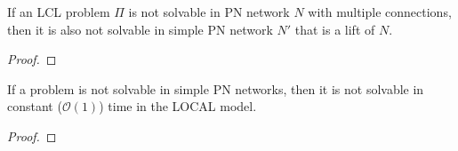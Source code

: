 
%
\begin{theorem} \label{thm:lcl_nonsolvability:4}
    If an LCL problem $\Pi$ is not solvable in PN network $N$ with multiple connections, then it is also not solvable in simple PN network $N'$ that is a lift of $N$.
\end{theorem}
\begin{proof}
\end{proof}



\begin{theorem}
    If a problem is not solvable in simple PN networks, then it is not solvable in constant ($\mathcal{O}(1)$) time in the LOCAL model.
\end{theorem}
\begin{proof}
\end{proof}